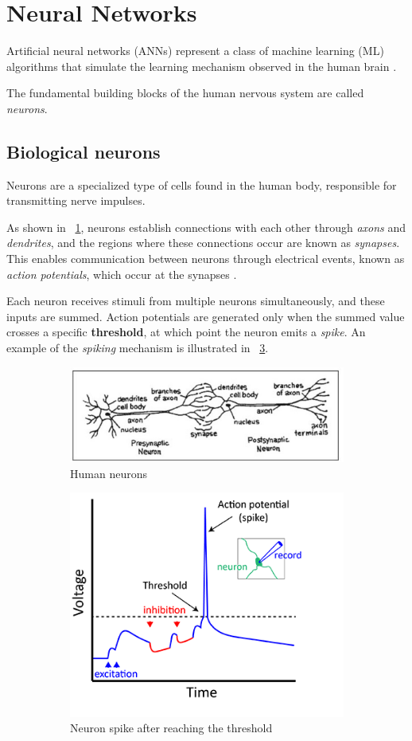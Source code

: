 \section{Neural Networks}
Artificial neural networks (ANNs) represent a class of machine learning (ML) algorithms that simulate the learning mechanism observed in the human brain \cite{aggarwal2018neural}. 

The fundamental building blocks of the human nervous system are called \textit{neurons}. 

\subsection{Biological neurons}

Neurons are a specialized type of cells found in the human body, responsible for transmitting nerve impulses.

As shown in \Fig~\ref{fig:neurons}, neurons establish connections with each other through \textit{axons} and \textit{dendrites}, and the regions where these connections occur are known as \textit{synapses}. This enables communication between neurons through electrical events, known as \textit{action potentials}, which occur at the synapses \cite{APS}. 

Each neuron receives stimuli from multiple neurons simultaneously, and these inputs are summed. Action potentials are generated only when the summed value crosses a specific \textbf{threshold}, at which point the neuron emits a \textit{spike}. An example of the \textit{spiking} mechanism is illustrated in \Fig~\ref{fig:spking}.

\begin{figure}[h]
	\centering
	\begin{subfigure}{.5\textwidth}
		\centering
		\includegraphics[width=0.7\linewidth]{ImageFiles/NeuralNetworks/neuron}
		\caption{Human neurons}
		\label{fig:neurons}
	\end{subfigure}%
	\begin{subfigure}{.5\textwidth}
		\centering
		\includegraphics[width=0.5\linewidth]{ImageFiles/NeuralNetworks/spiking}
		\caption{Neuron spike after reaching the threshold}
		\label{fig:spking}
	\end{subfigure}
	\caption{}
\end{figure}

